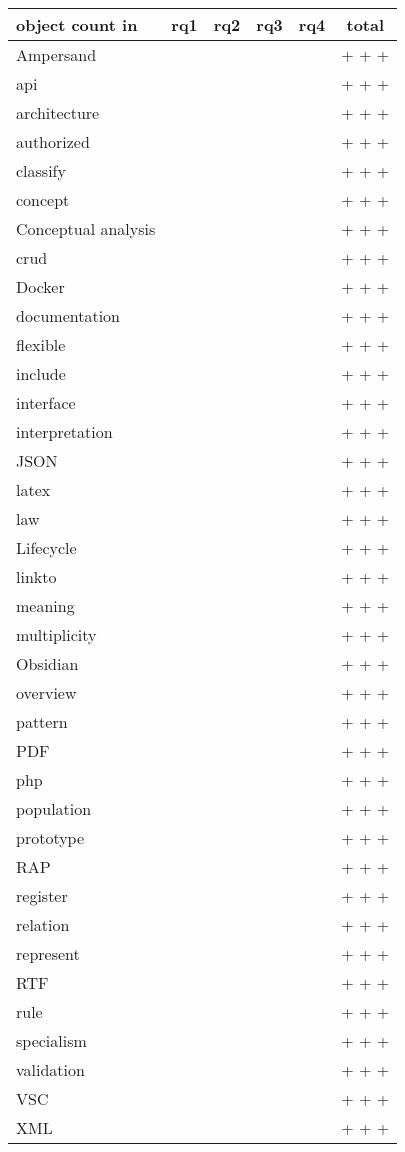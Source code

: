 \newcommand\tottab[1]{{#1} & \the\value{rq1-#1} & \the\value{rq2-#1} & \the\value{rq3-#1} & \the\value{rq4-#1} & \xintexpr \the\value{rq1-#1} + \the\value{rq2-#1} +\the\value{rq3-#1} +\the\value{rq4-#1} \relax \\ \hline}


\begin{tabular}{ || l | c | c | c |c|c||}
    \hline
    object count in & rq1 & rq2 & rq3 & rq4 & total\\
    \hline\hline

    \tottab{Ampersand} 
    \tottab{api}
    \tottab{architecture}
    \tottab{authorized}
    \tottab{classify}      
    \tottab{concept}
    \tottab{Conceptual analysis}
    \tottab{crud}           
    \tottab{Docker}   
    \tottab{documentation}
    \tottab{flexible}    
    \tottab{include}
    \tottab{interface} 
    \tottab{interpretation}
    \tottab{JSON}
    \tottab{latex}   
    \tottab{law}
    \tottab{Lifecycle}
    \tottab{linkto}        
    \tottab{meaning}
    \tottab{multiplicity}  
    \tottab{Obsidian}
    \tottab{overview}
    \tottab{pattern}
    \tottab{PDF}
    \tottab{php}
    \tottab{population}    
    \tottab{prototype}
    \tottab{RAP}     
    \tottab{register}
    \tottab{relation}
    \tottab{represent}      
    \tottab{RTF}
    \tottab{rule}
    \tottab{specialism}
    \tottab{validation}
    \tottab{VSC}
    \tottab{XML}

\end{tabular}

